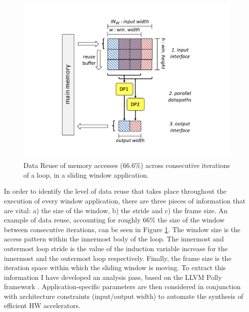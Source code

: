 \documentclass[]{usiinfthesis}
\begin{document}
\begin{figure}[t]
\centering
\vspace{-0.4cm}
\includegraphics[width= .8 \linewidth]{figs/Data_Reuse}
\vspace*{-1cm}
\caption{Data Reuse of memory accesses (66.6\%) across consecutive iterations of a loop, in a sliding
window application.}
\label{fig:data_reuse}
\end{figure}


In order to identify the level of data reuse that takes place throughout the execution of every
window application, there are three pieces of information that are vital: a) the size of the window, 
b) the stride and c) the frame size.
An example of data reuse, accounting for roughly 66\% the size of the window between consecutive 
iterations, can be seen in Figure \ref{fig:data_reuse}.
The window size is the access pattern
within the innermost body of the loop. The innermost and outermost
loop stride is the value of the induction variable increase for the innermost
and the outermost loop respectively. Finally, the frame size is
the iteration space within which the sliding window is moving. To extract this information 
I have developed an analysis pass, based on the LLVM Polly framework \cite{GrosserApr12}. 
Application-specific parameters are then considered in conjunction with architecture constraints 
(input/output width) to automate the synthesis of efficient HW accelerators.\par
\end{document}
